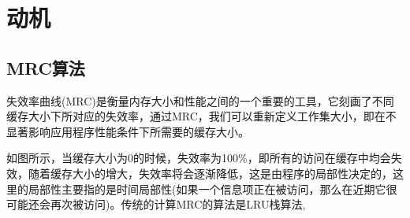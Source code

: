 
\chapter{动机}
\section{MRC算法}
失效率曲线(MRC)是衡量内存大小和性能之间的一个重要的工具，它刻画了不同缓存大小下所对应的失效率，通过MRC，我们可以重新定义工作集大小，即在不显著影响应用程序性能条件下所需要的缓存大小。

如图所示，当缓存大小为0的时候，失效率为100\%，即所有的访问在缓存中均会失效，随着缓存大小的增大，失效率将会逐渐降低，这是由程序的局部性决定的，这里的局部性主要指的是时间局部性(如果一个信息项正在被访问，那么在近期它很可能还会再次被访问)。传统的计算MRC的算法是LRU栈算法\supercite{Mattson1970Evaluation},


